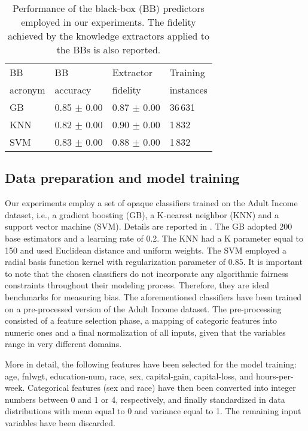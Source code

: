 \documentclass[letterpaper]{article} %
\begin{document}
\begin{table}[t!]
	\begin{center}{\caption{Performance of the black-box (BB) predictors employed in our experiments. The fidelity achieved by the knowledge extractors applied to the BBs is also reported.}\label{tab:bb}}
		\begin{tabular}{llll}
			\toprule
			BB & BB & Extractor & Training \\
			acronym & accuracy & fidelity & instances \\
			\midrule					
			GB & 0.85 $\pm$ 0.00 & 0.87 $\pm$ 0.00 & 36\,631 \\
			\midrule
			KNN & 0.82 $\pm$ 0.00 & 0.90 $\pm$ 0.00 & 1\,832 \\
			\midrule
			SVM & 0.83 $\pm$ 0.00 & 0.88 $\pm$ 0.00 & 1\,832 \\
			\bottomrule
		\end{tabular}
	\end{center}
\end{table}

\subsection{Data preparation and model training}

Our experiments employ a set of opaque classifiers trained on the Adult Income dataset, i.e., a gradient boosting (GB), a K-nearest neighbor (KNN) and a support vector machine (SVM). Details are reported in . 
%
The GB adopted 200 base estimators and a learning rate of 0.2.
%
The KNN had a K parameter equal to 150 and used Euclidean distance and uniform weights.
%
The SVM employed a radial basis function kernel with regularization parameter of 0.85.
%
It is important to note that the chosen classifiers do not incorporate any algorithmic fairness constraints throughout their modeling process. 
Therefore, they are ideal benchmarks for measuring bias.
% 
The aforementioned classifiers have been trained on a pre-processed version of the Adult Income dataset.
%
The pre-processing consisted of a feature selection phase, a mapping of categoric features into numeric ones and a final normalization of all inputs, given that the variables range in very different domains.

More in detail, the following features have been selected for the model training: age, fnlwgt, education-num, race, sex, capital-gain, capital-loss, and hours-per-week.
%
Categorical features (sex and race) have then been converted into integer numbers between 0 and 1 or 4, respectively, and finally standardized in data distributions with mean equal to 0 and variance equal to 1.
%
The remaining input variables have been discarded.
\end{document}
